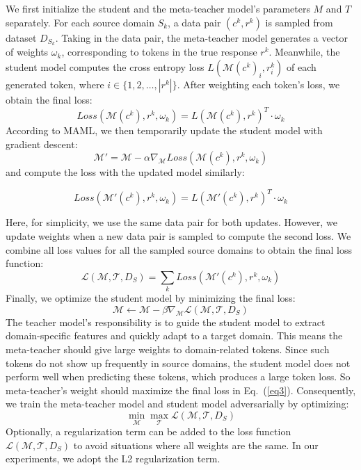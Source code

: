 \documentclass[letterpaper]{article} %
\begin{document}
We first initialize the student and the meta-teacher model's parameters $M$ and $T$ separately. 
For each source domain $S_k$, a data pair $(c^k,{r}^k)$ is sampled from dataset $D_{S_k}$. 
Taking in the data pair, the meta-teacher model generates a  vector of weights $\omega_k$, corresponding to tokens in the true response ${r}^k$.
%
Meanwhile, the student model computes the cross entropy loss ${\mathit{L}(\mathcal{M}(c^k)_i,{r}_i^k)}$ of each generated token, where $i\in\{1,2,\dots,|{r}^k|\}$. 
After weighting each token's loss, we obtain the final loss:
$$Loss(\mathcal{M}( c^k),{r}^k,\omega_k)={\mathit{L}(\mathcal{M}(c^k),{r}^k)}^T\cdot \omega_k$$
According to MAML, we then temporarily update the student model with gradient descent:
$$\mathcal{M}'=\mathcal{M}-\alpha \nabla_{\mathcal{M}}Loss(\mathcal{M}(c^k), {r}^k, \omega_k)$$
and compute the loss with the updated model similarly:

$$Loss(\mathcal{M'}(c^k),{r}^k,\omega_k)={\mathit{L}(\mathcal{M'}(c^k),{r}^k)}^T\cdot \omega_k$$

Here, for simplicity, we use the same data pair for both updates. However, we update weights when a new data pair is sampled to compute the second loss.
%
We combine all loss values for all the sampled source domains to obtain the final loss function:
\begin{equation}\label{eq3}
\mathscr{L}(\mathcal{M},\mathcal{T}, D_S)=\sum_k \mathit{Loss}(\mathcal{M}'( c^k), {r}^k, \omega_k)
\end{equation}
Finally, we optimize the student model by minimizing the final loss:
$$\mathcal{M} \leftarrow \mathcal{M} - \beta \nabla_{\mathcal{M}} \mathscr{L}(\mathcal{M},\mathcal{T}, D_S)$$
The teacher model's responsibility is to guide the student model to extract domain-specific features and quickly adapt to a target domain. 
This means the meta-teacher should give large weights to domain-related tokens. Since such tokens do not show up frequently in source domains, the student model does not perform well when predicting these tokens, which produces a large token loss.
So meta-teacher's weight should maximize the final loss in Eq.~(\ref{eq3}).
Consequently, we train the meta-teacher model and student model adversarially by optimizing:
$$\min_{\mathcal{M}}\max_{\mathcal{T}}\mathscr{L}(\mathcal{M},\mathcal{T}, D_S)$$
Optionally, a regularization term can be added to the loss function $\mathscr{L}(\mathcal{M},\mathcal{T}, D_S)$ to avoid situations where all weights are the same. In our experiments, we adopt the L2 regularization term.
\end{document}
